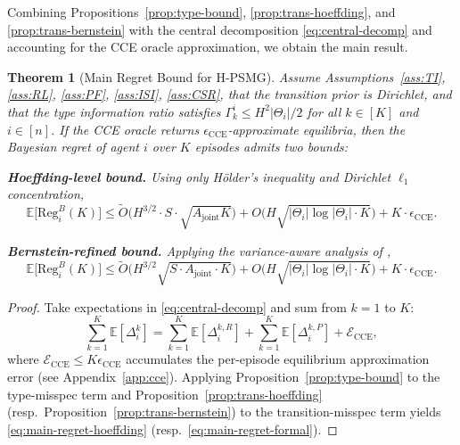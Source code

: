 \documentclass{article}
\newtheorem{theorem}{Theorem}[section]
\begin{document}
Combining Propositions~\ref{prop:type-bound}, \ref{prop:trans-hoeffding}, and \ref{prop:trans-bernstein} with the central decomposition \eqref{eq:central-decomp} and accounting for the CCE oracle approximation, we obtain the main result.

\begin{theorem}[Main Regret Bound for H-PSMG]
\label{thm:main-regret}
Assume Assumptions~\ref{ass:TI}, \ref{ass:RL}, \ref{ass:PF}, \ref{ass:ISI}, \ref{ass:CSR}, that the transition prior is Dirichlet, and that the type information ratio satisfies $\Gamma_k^i \leq H^2 |\Theta_i|/2$ for all $k \in [K]$ and $i \in [n]$. If the CCE oracle returns $\epsilon_{\mathrm{CCE}}$-approximate equilibria, then the Bayesian regret of agent $i$ over $K$ episodes admits two bounds:

\textbf{Hoeffding-level bound.} Using only Hölder's inequality and Dirichlet $\ell_1$ concentration,
\begin{equation}
\label{eq:main-regret-hoeffding}
\mathbb{E}\big[\mathrm{Reg}_i^B(K)\big] \leq \tilde{O}\Big(H^{3/2} \cdot S \cdot \sqrt{A_{\mathrm{joint}} K}\Big) + O\Big(H \sqrt{|\Theta_i| \log|\Theta_i| \cdot K}\Big) + K \cdot \epsilon_{\mathrm{CCE}}.
\end{equation}

\textbf{Bernstein-refined bound.} Applying the variance-aware analysis of \citet{lu2019information,azar2017minimax},
\begin{equation}
\label{eq:main-regret-formal}
\mathbb{E}\big[\mathrm{Reg}_i^B(K)\big] \leq \tilde{O}\Big(H^{3/2}\sqrt{S \cdot A_{\mathrm{joint}} \cdot K}\Big) + O\Big(H \sqrt{|\Theta_i| \log|\Theta_i| \cdot K}\Big) + K \cdot \epsilon_{\mathrm{CCE}}.
\end{equation}
\end{theorem}

\begin{proof}
Take expectations in \eqref{eq:central-decomp} and sum from $k=1$ to $K$:
\begin{equation}
\sum_{k=1}^K \mathbb{E}[\Delta_i^k] = \sum_{k=1}^K \mathbb{E}[\Delta_i^{k,R}] + \sum_{k=1}^K \mathbb{E}[\Delta_i^{k,P}] + \mathcal{E}_{\mathrm{CCE}},
\end{equation}
where $\mathcal{E}_{\mathrm{CCE}} \leq K \epsilon_{\mathrm{CCE}}$ accumulates the per-episode equilibrium approximation error (see Appendix~\ref{app:cce}). Applying Proposition~\ref{prop:type-bound} to the type-misspec term and Proposition~\ref{prop:trans-hoeffding} (resp.\ Proposition~\ref{prop:trans-bernstein}) to the transition-misspec term yields \eqref{eq:main-regret-hoeffding} (resp.\ \eqref{eq:main-regret-formal}).
\end{proof}
\end{document}
